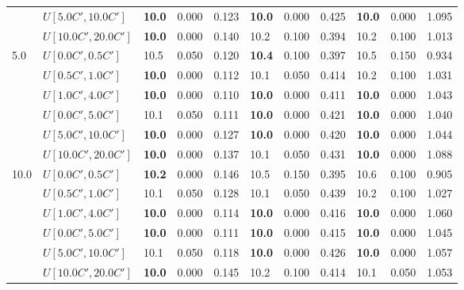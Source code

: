 \begin{table}[h]
{\begin{tabular}{|l|l||l|l|l||l|l|l||l|l|l|}
       & $U[5.0C',10.0C']$ & \textbf{10.0} & 0.000 & 0.123 & \textbf{10.0} & 0.000 & 0.425 & \textbf{10.0} & 0.000 & 1.095 \\
       & $U[10.0C',20.0C']$ & \textbf{10.0} & 0.000 & 0.140 & 10.2 & 0.100 & 0.394 & 10.2 & 0.100 & 1.013 \\
      \hline\hline
      \multirow{6}{*}{5.0} & $U[0.0C',0.5C']$ & 10.5 & 0.050 & 0.120 & \textbf{10.4} & 0.100 & 0.397 & 10.5 & 0.150 & 0.934 \\
       & $U[0.5C',1.0C']$ & \textbf{10.0} & 0.000 & 0.112 & 10.1 & 0.050 & 0.414 & 10.2 & 0.100 & 1.031 \\
       & $U[1.0C',4.0C']$ & \textbf{10.0} & 0.000 & 0.110 & \textbf{10.0} & 0.000 & 0.411 & \textbf{10.0} & 0.000 & 1.043 \\
       & $U[0.0C',5.0C']$ & 10.1 & 0.050 & 0.111 & \textbf{10.0} & 0.000 & 0.421 & \textbf{10.0} & 0.000 & 1.040 \\
       & $U[5.0C',10.0C']$ & \textbf{10.0} & 0.000 & 0.127 & \textbf{10.0} & 0.000 & 0.420 & \textbf{10.0} & 0.000 & 1.044 \\
       & $U[10.0C',20.0C']$ & \textbf{10.0} & 0.000 & 0.137 & 10.1 & 0.050 & 0.431 & \textbf{10.0} & 0.000 & 1.088 \\
      \hline\hline
      \multirow{6}{*}{10.0} & $U[0.0C',0.5C']$ & \textbf{10.2} & 0.000 & 0.146 & 10.5 & 0.150 & 0.395 & 10.6 & 0.100 & 0.905 \\
       & $U[0.5C',1.0C']$ & 10.1 & 0.050 & 0.128 & 10.1 & 0.050 & 0.439 & 10.2 & 0.100 & 1.027 \\
       & $U[1.0C',4.0C']$ & \textbf{10.0} & 0.000 & 0.114 & \textbf{10.0} & 0.000 & 0.416 & \textbf{10.0} & 0.000 & 1.060 \\
       & $U[0.0C',5.0C']$ & \textbf{10.0} & 0.000 & 0.111 & \textbf{10.0} & 0.000 & 0.415 & \textbf{10.0} & 0.000 & 1.045 \\
       & $U[5.0C',10.0C']$ & 10.1 & 0.050 & 0.118 & \textbf{10.0} & 0.000 & 0.426 & \textbf{10.0} & 0.000 & 1.057 \\
       & $U[10.0C',20.0C']$ & \textbf{10.0} & 0.000 & 0.145 & 10.2 & 0.100 & 0.414 & 10.1 & 0.050 & 1.053 \\
      \hline
      \end{tabular}
      }
      \label{tab:pcpn90p7RecoloredTT}
      \end{table}

